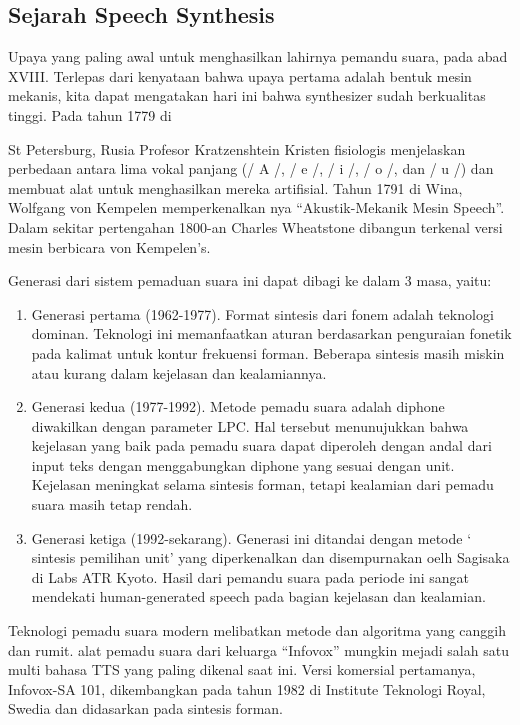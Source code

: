 \subsection{Sejarah Speech Synthesis}
Upaya yang paling awal untuk menghasilkan lahirnya pemandu suara, pada abad XVIII. Terlepas dari kenyataan bahwa upaya pertama  adalah bentuk mesin mekanis, kita dapat mengatakan hari ini  bahwa synthesizer sudah berkualitas tinggi. Pada tahun 1779 di

St Petersburg, Rusia Profesor Kratzenshtein Kristen  fisiologis menjelaskan perbedaan antara lima vokal panjang  (/ A /, / e /, / i /, / o /, dan / u /) dan membuat alat untuk menghasilkan  mereka artifisial. Tahun 1791 di Wina, Wolfgang von Kempelen memperkenalkan nya “Akustik-Mekanik Mesin Speech”. Dalam  sekitar pertengahan 1800-an Charles Wheatstone dibangun terkenal  versi mesin berbicara von Kempelen’s.

Generasi dari sistem pemaduan suara ini dapat dibagi ke dalam 3 masa, yaitu:

\begin{enumerate}
\item Generasi pertama (1962-1977). Format sintesis dari fonem adalah teknologi dominan. Teknologi ini memanfaatkan aturan berdasarkan penguraian fonetik pada kalimat untuk kontur frekuensi forman. Beberapa sintesis masih miskin atau kurang dalam kejelasan dan kealamiannya.
\item Generasi kedua (1977-1992). Metode pemadu suara adalah diphone diwakilkan  dengan parameter LPC. Hal tersebut menunujukkan bahwa kejelasan yang baik pada pemadu suara dapat diperoleh dengan andal dari input teks dengan menggabungkan diphone yang sesuai dengan unit. Kejelasan meningkat selama sintesis forman, tetapi kealamian dari pemadu suara masih tetap rendah.
\item Generasi ketiga (1992-sekarang). Generasi ini ditandai dengan metode ‘ sintesis pemilihan unit’ yang diperkenalkan dan disempurnakan oelh Sagisaka di Labs ATR Kyoto. Hasil dari pemandu suara pada periode ini sangat mendekati human-generated speech pada bagian kejelasan dan kealamian.
\end{enumerate}

Teknologi pemadu suara modern melibatkan metode dan algoritma yang canggih dan rumit. alat pemadu suara  dari keluarga “Infovox” mungkin mejadi salah satu multi bahasa TTS yang paling dikenal saat ini. Versi komersial pertamanya, Infovox-SA 101, dikembangkan pada tahun 1982 di Institute Teknologi Royal, Swedia dan didasarkan pada sintesis forman.

